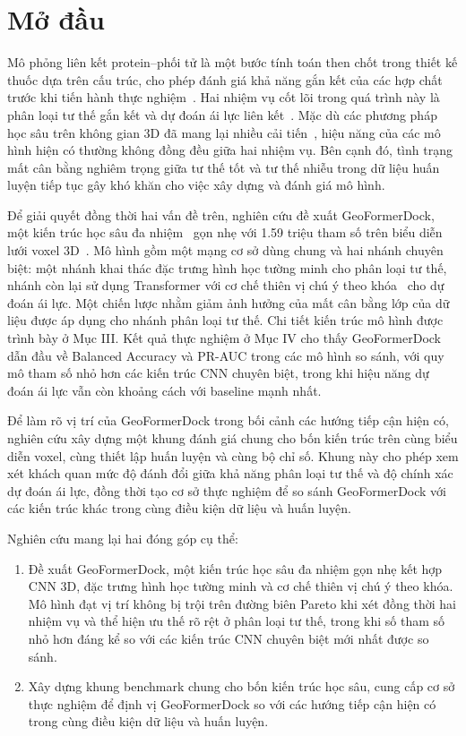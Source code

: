 \section{Mở đầu}
Mô phỏng liên kết protein--phối tử là một bước tính toán then chốt trong thiết kế thuốc dựa trên cấu trúc, cho phép đánh giá khả năng gắn kết của các hợp chất trước khi tiến hành thực nghiệm~\cite{dhillon2024molecular, li2024deep}. Hai nhiệm vụ cốt lõi trong quá trình này là phân loại tư thế gắn kết và dự đoán ái lực liên kết~\cite{ragoza2017protein, francoeur2020three}. Mặc dù các phương pháp học sâu trên không gian 3D đã mang lại nhiều cải tiến~\cite{stepniewska2018development, mcnutt2021gnina}, hiệu năng của các mô hình hiện có thường không đồng đều giữa hai nhiệm vụ. Bên cạnh đó, tình trạng mất cân bằng nghiêm trọng giữa tư thế tốt và tư thế nhiễu trong dữ liệu huấn luyện tiếp tục gây khó khăn cho việc xây dựng và đánh giá mô hình.


Để giải quyết đồng thời hai vấn đề trên, nghiên cứu đề xuất GeoFormerDock, một kiến trúc học sâu đa nhiệm~\cite{caruana1997multitask} gọn nhẹ với 1.59 triệu tham số trên biểu diễn lưới voxel 3D~\cite{francoeur2020three}. Mô hình gồm một mạng cơ sở dùng chung và hai nhánh chuyên biệt: một nhánh khai thác đặc trưng hình học tường minh cho phân loại tư thế, nhánh còn lại sử dụng Transformer với cơ chế thiên vị chú ý theo khóa~\cite{vaswani2017attention} cho dự đoán ái lực. Một chiến lược nhằm giảm ảnh hưởng của mất cân bằng lớp của dữ liệu được áp dụng cho nhánh phân loại tư thế. Chi tiết kiến trúc mô hình được trình bày ở Mục III. Kết quả thực nghiệm ở Mục IV cho thấy GeoFormerDock dẫn đầu về Balanced Accuracy và PR-AUC trong các mô hình so sánh, với quy mô tham số nhỏ hơn các kiến trúc CNN chuyên biệt, trong khi hiệu năng dự đoán ái lực vẫn còn khoảng cách với baseline mạnh nhất.

Để làm rõ vị trí của GeoFormerDock trong bối cảnh các hướng tiếp cận hiện có, nghiên cứu xây dựng một khung đánh giá chung cho bốn kiến trúc trên cùng biểu diễn voxel, cùng thiết lập huấn luyện và cùng bộ chỉ số. Khung này cho phép xem xét khách quan mức độ đánh đổi giữa khả năng phân loại tư thế và độ chính xác dự đoán ái lực, đồng thời tạo cơ sở thực nghiệm để so sánh GeoFormerDock với các kiến trúc khác trong cùng điều kiện dữ liệu và huấn luyện.


Nghiên cứu mang lại hai đóng góp cụ thể:
\begin{enumerate}
    \item Đề xuất GeoFormerDock, một kiến trúc học sâu đa nhiệm gọn nhẹ kết hợp CNN 3D, đặc trưng hình học tường minh và cơ chế thiên vị chú ý theo khóa. Mô hình đạt vị trí không bị trội trên đường biên Pareto khi xét đồng thời hai nhiệm vụ và thể hiện ưu thế rõ rệt ở phân loại tư thế, trong khi số tham số nhỏ hơn đáng kể so với các kiến trúc CNN chuyên biệt mới nhất được so sánh.
    \item Xây dựng khung benchmark chung cho bốn kiến trúc học sâu, cung cấp cơ sở thực nghiệm để định vị GeoFormerDock so với các hướng tiếp cận hiện có trong cùng điều kiện dữ liệu và huấn luyện.
\end{enumerate}